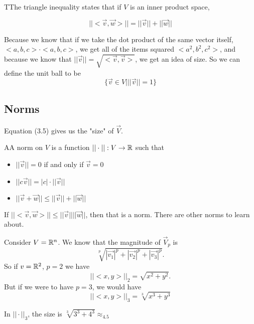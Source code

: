 	\begin{theorem}
		TThe triangle inequality states that if $V$ is an inner product space,

		\begin{equation}
			| | <\vec{v},\vec{w}> | | = | | \vec{v} | | + | | \vec{w} | |
		\end{equation}
	\end{theorem}

	Because we know that if we take the dot product of the same vector itself, $<a,b,c>\cdot<a,b,c>$, we get all of the items squared $<a^2,b^2,c^2>$, and because we know that $| | \vec{v} | | = \sqrt{<\vec{v},\vec{v}>}$, we get an idea of size. So we can define the unit ball to be 
	\begin{equation}
		\{\vec{v}\in V\Big| | | \vec{v} | | = 1\}		
	\end{equation}

\subsection{Norms}

	Equation (3.5) gives us the "size" of $\vec{V}$.

	\begin{definition}
		AA norm on $V$ is a function $ | | \cdot | |:V\to\mathbb{R}$ such that 
		\begin{itemize}
			\item $| | \vec{v} | | = 0$ if and only if $\vec{v}=0$
			\item $| | c\vec{v} | | = |c|\cdot| | \vec{v} | |$
			\item $| | \vec{v}+\vec{w} | | \le | | \vec{v} | | + | | \vec{w} | |$
		\end{itemize}

		If $||<\vec{v},\vec{w}>||\le | | \vec{v}  | | | | \vec{w} | |$, then that is a norm. There are other norms to learn about. 
			
	\end{definition}

	\begin{problem}
		Consider $V=\mathbb{R}^n$. We know that the magnitude of $\vec{V}_p$ is 
		\begin{equation}
			\sqrt[p]{|\vec{v_1}|^p+|\vec{v_2}|^p+|\vec{v_3}|^p}.
		\end{equation}
		So if $v=\mathbb{R}^2$, $p=2$ we have 
		\begin{equation}
			| |<x,y>| | _2=\sqrt{x^2+y^2}. 
		\end{equation}
		But if we were to have $p=3$, we would have 
		\begin{equation}
			| | <x,y> | |_3=\sqrt[3]{x^3+y^3}
		\end{equation}
		
		In $| | \cdot | |_3$, the size is $\sqrt[3]{3^3+4^3} \approx_4.5$
	\end{problem}

